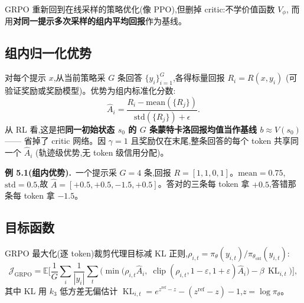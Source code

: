 \documentclass[11pt]{article}
\newcommand{\E}{\mathbb{E}}
\newcommand{\piold}{\pi_{\theta_{\mathrm{old}}}}
\newcommand{\pith}{\pi_\theta}
\DeclareMathOperator{\clip}{clip}
\DeclareMathOperator{\KLop}{KL}
\theoremstyle{plain}
\theoremstyle{definition}
\theoremstyle{remark}
\begin{document}
GRPO 重新回到在线采样的策略优化(像 PPO),但删掉 critic:不学价值函数 $V_\phi$,
而用\textbf{对同一提示多次采样的组内平均回报}作为基线。

\subsection{组内归一化优势}

对每个提示 $x$,从当前策略采 $G$ 条回答 $\{y_i\}_{i=1}^G$,各得标量回报 $R_i=R(x,y_i)$
(可验证奖励或奖励模型)。优势为组内标准化分数:
\begin{equation}\label{eq:grpo-adv}
\hat A_i=\frac{R_i-\mathrm{mean}(\{R_j\})}{\mathrm{std}(\{R_j\})+\epsilon}.
\end{equation}
从 RL 看,这是把\textbf{同一初始状态 $s_0$ 的 $G$ 条蒙特卡洛回报均值当作基线 $b\approx V(s_0)$}——
省掉了 critic 网络。因 $\gamma=1$ 且奖励仅在末尾,整条回答的每个 token 共享同一个 $\hat A_i$
(轨迹级优势,无 token 级信用分配)。

\begin{exbox}
\textbf{例 5.1(组内优势).}\ 一个提示采 $G=4$ 条,回报 $R=[1,1,0,1]$。$\mathrm{mean}=0.75$,
$\mathrm{std}=0.5$,故 $\hat A=[+0.5,+0.5,-1.5,+0.5]$。答对的三条每 token 拿 $+0.5$,答错那条每 token 拿 $-1.5$。
\end{exbox}

\subsection{目标函数}

GRPO 最大化(逐 token)裁剪代理目标减 KL 正则,$\rho_{i,t}=\pith(y_{i,t})/\piold(y_{i,t})$:
\begin{equation}\label{eq:grpo-obj}
\mathcal{J}_{\mathrm{GRPO}}=\E\Big[\frac{1}{G}\sum_i\frac{1}{|y_i|}\sum_t
\Big(\min\big(\rho_{i,t}\hat A_i,\;\clip(\rho_{i,t},1\!-\!\varepsilon,1\!+\!\varepsilon)\hat A_i\big)
-\beta\,\KLop_{i,t}\Big)\Big],
\end{equation}
其中 KL 用 $k_3$ 低方差无偏估计 $\KLop_{i,t}=e^{z^{\mathrm{ref}}-z}-(z^{\mathrm{ref}}-z)-1$,$z=\log\pith$。
\end{document}
